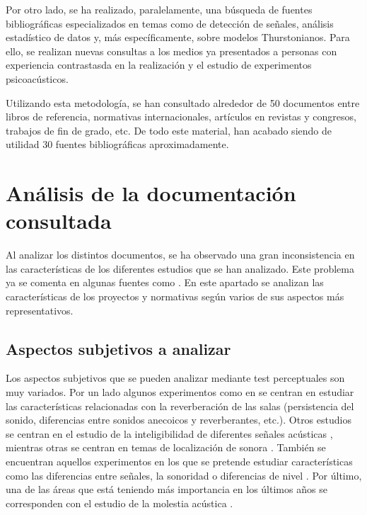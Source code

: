 \documentclass[11pt,a4paper]{book}
\begin{document}
    Por otro lado, se ha realizado, paralelamente, una búsqueda de fuentes bibliográficas especializados en temas como de detección de señales, análisis estadístico de datos y, más específicamente, sobre modelos Thurstonianos. Para ello, se realizan nuevas consultas a los medios ya presentados a personas con experiencia contrastasda en la realización y el estudio de experimentos psicoacústicos.\newline
    
    Utilizando esta metodología, se han consultado alrededor de 50 documentos entre libros de referencia, normativas internacionales, artículos en revistas y congresos, trabajos de fin de grado, etc. De todo este material, han acabado siendo de utilidad 30 fuentes bibliográficas aproximadamente.
    
    \section{Análisis de la documentación consultada}
    
    Al analizar los distintos documentos, se ha observado una gran inconsistencia en las características de los diferentes estudios que se han analizado. Este problema ya se comenta en algunas fuentes como \cite{Tejada2020}. En este apartado se analizan las características de los proyectos y normativas según varios de sus aspectos más representativos. 
    
        \subsection{Aspectos subjetivos a analizar}
		    Los aspectos subjetivos que se pueden analizar mediante test perceptuales son muy variados. Por un lado algunos experimentos como en \cite{1995GASoulodre, 2016SKlockgether,  2016BPostma, 2002PZahorik} se centran en estudiar las características relacionadas con la reverberación de las salas (persistencia del sonido, diferencias entre sonidos anecoicos y reverberantes, etc.). Otros estudios se centran en el estudio de la inteligibilidad de diferentes señales acústicas \cite{ 1999JBradley, 2010FMartellotta,  2010MVigeant}, mientras otras se centran en temas de localización de sonora \cite{1997SCarlile, 2019MShiell, 2019MYamada, 2019DMorikawa}. También se encuentran aquellos experimentos en los que se pretende estudiar características como las diferencias entre señales, la sonoridad o diferencias de nivel \cite{2019GPulvirenti, 2016SKlockgether, 2019MNowak, 2011VEmiya, 2019LKritly, 2005IWitew,  2019DJSchlit}. Por último, una de las áreas que está teniendo más importancia en los últimos años se corresponden con el estudio de la molestia acústica \cite{2019VHongisto, 2019JLee, 2019VRajala}.
		    
\end{document}
